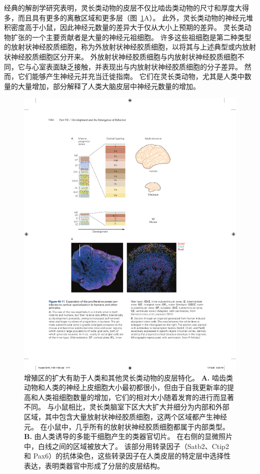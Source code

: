 经典的解剖学研究表明，灵长类动物的皮层不仅比啮齿类动物的尺寸和厚度大得多，而且具有更多的离散区域和更多层（图~\ref{fig:46_11}A）。
此外，灵长类动物的神经元堆积密度高于小鼠，因此神经元数量的差异大于仅从大小上预期的差异。
灵长类动物扩张的一个主要贡献者是大量的神经元祖细胞。
许多这些祖细胞是第二种类型的放射状神经胶质细胞，称为外放射状神经胶质细胞，以将其与上述典型或内放射状神经胶质细胞区分开来。
外放射状神经胶质细胞与内放射状神经胶质细胞不同，它与心室表面缺乏接触，并表现出与内放射状神经胶质细胞的分子差异。
然而，它们能够产生神经元并充当迁徙指南。
它们在灵长类动物，尤其是人类中数量的大量增加，部分解释了人类大脑皮层中神经元数量的增加。


\begin{figure}[htbp]
	\centering
	\includegraphics[width=1.0\linewidth]{chap46/fig_46_11}
	\caption{增殖区的扩大有助于人类和其他灵长类动物的皮层特化。
		\textbf{A.} 啮齿类动物和人类的神经上皮细胞大小最初都很小，但由于自我更新率的提高和人类祖细胞数量的增加，它们的相对大小随着发育的进行而显著不同。
		与小鼠相比，灵长类脑室下区大大扩大并细分为内部和外部区域，其中包含大量放射状神经胶质细胞，这两个区域都产生神经元。
		在小鼠中，几乎所有的放射状神经胶质细胞都属于内部类型\cite{giandomenico2017probing}。
		\textbf{B.} 由人类诱导的多能干细胞产生的类器官切片。
		在右侧的显微照片中，白线之间的区域被放大了。
		该部分用转录因子（Satb2、Ctip2 和 Pax6）的抗体染色，这些转录因子在人类皮层的特定层中选择性表达，表明类器官中形成了分层的皮层结构。}
	\label{fig:46_11}
\end{figure}


